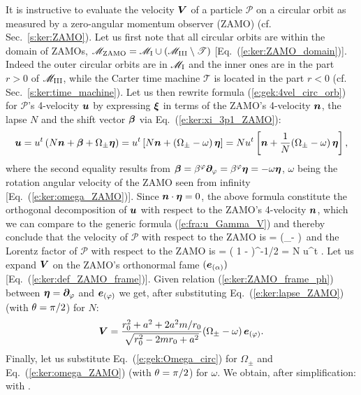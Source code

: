 It is instructive to evaluate the velocity $\bm{V}$ of a particle $\mathscr{P}$
on a circular orbit as measured by a zero-angular momentum observer (ZAMO)
(cf. Sec.~\ref{s:ker:ZAMO}).
Let us first note that all circular orbits are within the domain of ZAMOs,
$\mathscr{M}_{\rm ZAMO} = \mathscr{M}_{\rm I} \cup (\mathscr{M}_{\rm III}\setminus \mathscr{T})$
[Eq.~(\ref{e:ker:ZAMO_domain})]. Indeed the outer circular orbits are in $\mathscr{M}_{\rm I}$
and the inner ones are in the part $r>0$ of $\mathscr{M}_{\rm III}$, while the
Carter time machine $\mathscr{T}$ is located in the part $r<0$ (cf. Sec.~\ref{s:ker:time_machine}).
Let us then rewrite
formula (\ref{e:gek:4vel_circ_orb}) for $\mathscr{P}$'s 4-velocity $\bm{u}$
by expressing $\bm{\xi}$ in terms of the ZAMO's 4-velocity $\bm{n}$, the lapse $N$
and the shift vector $\bm{\beta}$
via Eq.~(\ref{e:ker:xi_3p1_ZAMO}):
\[
    \bm{u} = u^t\left( N \bm{n} + \bm{\beta} + \Omega_\pm \bm{\eta} \right)
      = u^t \left[ N \bm{n} + (\Omega_\pm - \omega)\, \bm{\eta} \right]
      = N u^t \left[ \bm{n} + \frac{1}{N} (\Omega_\pm - \omega) \, \bm{\eta} \right],
\]
where the second equality results from
$\bm{\beta} = \beta^\varphi \bm{\partial}_\varphi = \beta^\varphi \bm{\eta} = - \omega \bm{\eta}$,
$\omega$ being the rotation angular velocity of the ZAMO seen from
infinity [Eq.~(\ref{e:ker:omega_ZAMO})]. Since $\bm{n}\cdot\bm{\eta} = 0$, the
above formula constitute the orthogonal decomposition of $\bm{u}$ with
respect to the ZAMO's 4-velocity $\bm{n}$, which we can compare to the generic
formula (\ref{e:fra:u_Gamma_V}) and thereby conclude that
the velocity of $\mathscr{P}$ with respect to the ZAMO is
\be
     =  (\Omega_\pm - \omega)\,  \w{\eta}
\ee
and the Lorentz factor of $\mathscr{P}$ with respect to the ZAMO is
\be
    \Gamma = ( 1 - \cdot{})^{-1/2} = N u^t .
\ee
Let us expand $\bm{V}$ on the ZAMO's orthonormal fame $(\bm{e}_{(\alpha)})$
[Eq.~(\ref{e:ker:def_ZAMO_frame})]. Given relation (\ref{e:ker:ZAMO_frame_ph})
between $\bm{\eta} = \bm{\partial}_\varphi$ and $\bm{e}_{(\varphi)}$ we get, after
substituting Eq.~(\ref{e:ker:lapse_ZAMO}) (with $\theta=\pi/2$) for $N$:
\[
  \bm{V} = \frac{r_0^2 + a^2 + 2a^2 m/r_0}{\sqrt{r_0^2 - 2 m r_0 + a^2}}
      (\Omega_\pm - \omega)\, \bm{e}_{(\varphi)} .
\]
Finally, let us substitute Eq.~(\ref{e:gek:Omega_circ}) for $\Omega_\pm$
and Eq.~(\ref{e:ker:omega_ZAMO}) (with $\theta=\pi/2$) for $\omega$. We obtain,
after simplification:
\be \label{e:gek:v_ZAMO_circ_orb}
    \quad \mbox{with} \quad
     .

